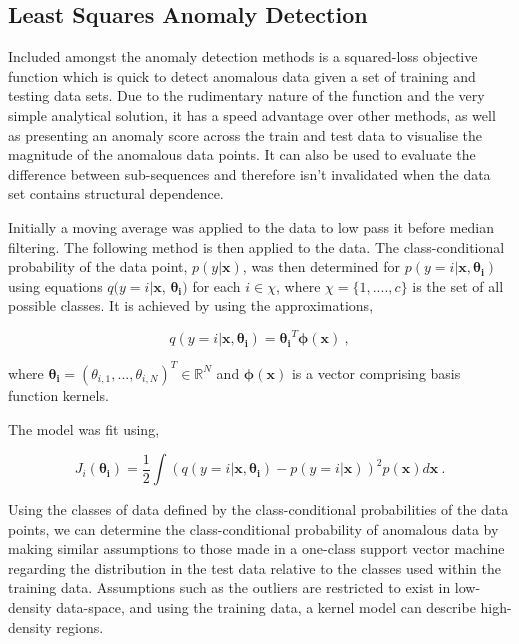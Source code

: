 \subsection{Least Squares Anomaly Detection}
Included amongst the anomaly detection methods is a squared-loss objective function which is quick to detect anomalous data given a set of training and testing data sets. Due to the rudimentary nature of the function and the very simple analytical solution, it has a speed advantage over other methods, as well as presenting an anomaly score across the train and test data to visualise the magnitude of the anomalous data points. It can also be used to evaluate the difference between sub-sequences and therefore isn't invalidated when the data set contains structural dependence.

Initially a moving average was applied to the data to low pass it before median filtering. The following method \cite{lsanomalypaper} is then applied to the data. The class-conditional probability of the data point,  $p(y|\mathbf{x})$, was then determined for $p(y=i|\mathbf{x}, \mathbf{\theta_i})$ using equations $q(y=i|\mathbf{x}$, $\mathbf{\theta_i})$ for each $i \in \chi$, where $\chi = \{1, ...., c\}$ is the set of all possible classes.
It is achieved by using the approximations,

\begin{equation}
q(y=i|\mathbf{x},\mathbf{\theta_i}) = \mathbf{\theta_i}^T\mathbf{\phi}(\mathbf{x})~,
\end{equation}

where $\mathbf{\theta_i} = (\theta_{i,1},...,\theta_{i,N})^T \in \mathbb{R}^N$ and $\mathbf{\phi}(\mathbf{x})$ is a vector comprising basis function kernels.

The model was fit using,

\begin{equation}
    J_i(\mathbf{\theta_i})=\dfrac{1}{2}\int(q(y=i|\mathbf{x},\mathbf{\theta_i}) - p(y=i|\mathbf{x}))^2p(\mathbf{x})d\mathbf{x}~.
\end{equation}

Using the classes of data defined by the class-conditional probabilities of the data points, we can determine the class-conditional probability of anomalous data by making similar assumptions to those made in a one-class support vector machine regarding the distribution in the test data relative to the classes used within the training data. Assumptions such as the outliers are restricted to exist in low-density data-space, and using the training data, a kernel model can describe high-density regions.

